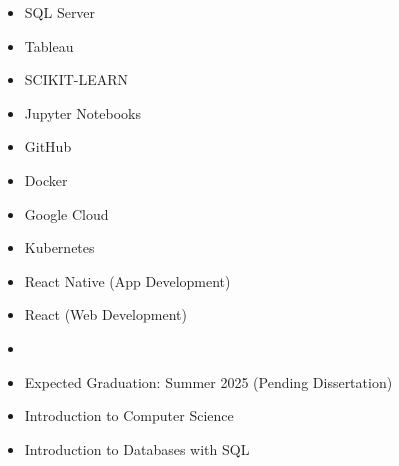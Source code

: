 \documentclass[10pt,a4paper,ragged2e,withhyper]{altacv}
\begin{document}
\begin{paracol}{2}
\begin{itemize}
  \item SQL Server
  \item Tableau
\end{itemize}

\begin{itemize}
  \item SCIKIT-LEARN
  \item Jupyter Notebooks
\end{itemize}

\begin{itemize}
  \item GitHub
  \item Docker
  \item Google Cloud
  \item Kubernetes
\end{itemize}




\scriptsize %
\begin{itemize}
  \item React Native (App Development)
  \item React (Web Development)
\end{itemize}

\begin{itemize}
  \item <unknown as of yet>
\end{itemize}

\endgroup



\switchcolumn

\begin{itemize}
  \item Expected Graduation: Summer 2025 (Pending Dissertation)
\end{itemize}
\begin{itemize}
  \item Introduction to Computer Science
  \item Introduction to Databases with SQL
\end{itemize}


\end{paracol}
\end{document}
